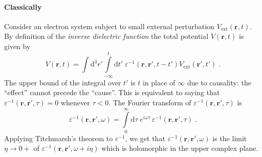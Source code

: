 \documentclass[a4paper,12pt]{article}
\begin{document}
    \paragraph{Classically} Consider an electron system subject to small external perturbation $V_\text{ext}(\mathbf{r}, t)$. By definition of the \textit{inverse dielectric function} the total potential $V(\mathbf{r}, t)$ is given by
    \begin{equation} \label{eq:cl:potentials_t}
        V(\mathbf{r}, t) 
            = \int\!\! \text{d}^3 r' \!\! \int\limits_{-\infty}^{t}\!\! \text{d} t'\; \varepsilon^{-1}(\mathbf{r}, \mathbf{r'}, t - t') V_\text{ext}(\mathbf{r'}, t')\; .
    \end{equation}
    The upper bound of the integral over $t'$ is $t$ in place of $\infty$ due to causality: the ``effect'' cannot precede the ``cause''. This is equivalent to saying that $\varepsilon^{-1}(\mathbf{r}, \mathbf{r'}, \tau) = 0$ whenever $\tau < 0$. The Fourier transform of $\varepsilon^{-1}(\mathbf{r}, \mathbf{r'}, \tau)$ is
    \begin{equation} \label{eq:cl:inv_dielectric_w}
        \varepsilon^{-1}(\mathbf{r},\mathbf{r'},\omega) = \int\limits_{0}^{\infty} \!\! \text{d}\tau \; e^{i\omega \tau}\,\varepsilon^{-1}(\mathbf{r}, \mathbf{r'}, \tau)\; .
    \end{equation}
    Applying Titchmarsh's theorem to $\varepsilon^{-1}$, we get that $\varepsilon^{-1}(\mathbf{r}, \mathbf{r'}, \omega)$ is the limit $\eta \to 0+$ of $\varepsilon^{-1}(\mathbf{r}, \mathbf{r'}, \omega + i\eta)$ which is holomorphic in the upper complex plane.
\end{document}
